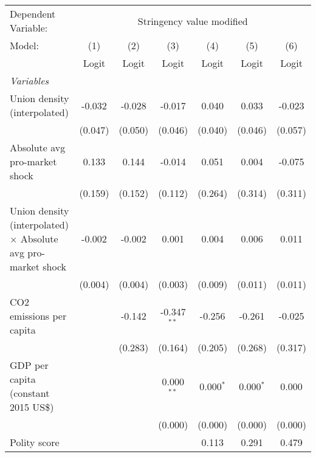 
\begingroup
\centering
\begin{tabular}{lcccccc}
   \toprule
   Dependent Variable: & \multicolumn{6}{c}{Stringency value modified}\\
   Model:                                                               & (1)     & (2)     & (3)           & (4)         & (5)         & (6)\\  
                                                                        &  Logit  & Logit   & Logit         & Logit       & Logit       & Logit\\  
   \midrule
   \emph{Variables}\\
   Union density (interpolated)                                         & -0.032  & -0.028  & -0.017        & 0.040       & 0.033       & -0.023\\   
                                                                        & (0.047) & (0.050) & (0.046)       & (0.040)     & (0.046)     & (0.057)\\   
   Absolute avg pro-market shock                                        & 0.133   & 0.144   & -0.014        & 0.051       & 0.004       & -0.075\\   
                                                                        & (0.159) & (0.152) & (0.112)       & (0.264)     & (0.314)     & (0.311)\\   
   Union density (interpolated) $\times$ Absolute avg pro-market shock  & -0.002  & -0.002  & 0.001         & 0.004       & 0.006       & 0.011\\   
                                                                        & (0.004) & (0.004) & (0.003)       & (0.009)     & (0.011)     & (0.011)\\   
   CO2 emissions per capita                                             &         & -0.142  & -0.347$^{**}$ & -0.256      & -0.261      & -0.025\\   
                                                                        &         & (0.283) & (0.164)       & (0.205)     & (0.268)     & (0.317)\\   
   GDP per capita (constant 2015 US\$)                                  &         &         & 0.000$^{**}$  & 0.000$^{*}$ & 0.000$^{*}$ & 0.000\\   
                                                                        &         &         & (0.000)       & (0.000)     & (0.000)     & (0.000)\\   
   Polity score                                                         &         &         &               & 0.113       & 0.291       & 0.479\\   

\end{tabular}
